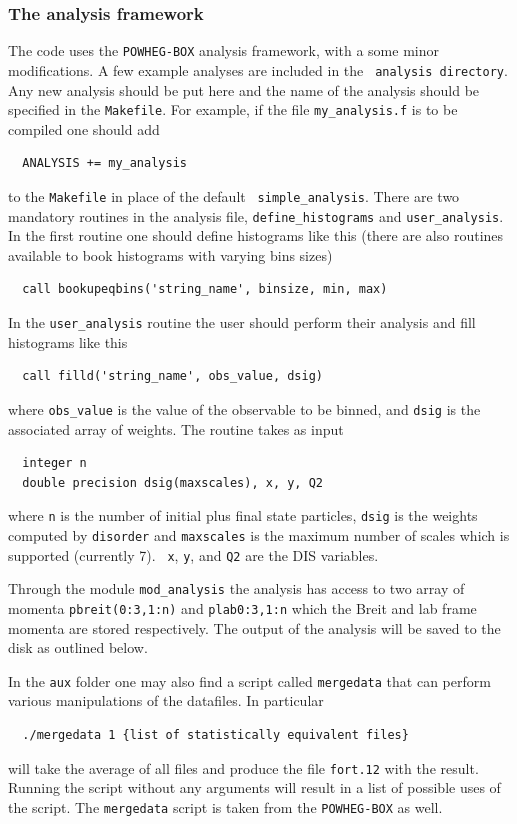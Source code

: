 \documentclass[submission, PhysCodeb]{SciPost}
\newcommand{\disorder}{{\tt disorder}}
\begin{document}
\subsubsection{The analysis framework}
The code uses the {\tt POWHEG-BOX} analysis framework, with a some
minor modifications. A few example analyses are included in the {\tt
  analysis directory}. Any new analysis should be put here and the
name of the analysis should be specified in the {\tt Makefile}. For
example, if the file {\tt my\_analysis.f} is to be compiled one should
add
\begin{lstlisting}
  ANALYSIS += my_analysis
\end{lstlisting}
to the {\tt Makefile} in place of the default {\tt
  simple\_analysis}. There are two mandatory routines in the analysis
file, {\tt define\_histograms} and {\tt user\_analysis}. In the first
routine one should define histograms like this (there are also
routines available to book histograms with varying bins sizes)
\begin{lstlisting}
  call bookupeqbins('string_name', binsize, min, max)
\end{lstlisting}
In the {\tt user\_analysis} routine the user should perform their
analysis and fill histograms like this
\begin{lstlisting}
  call filld('string_name', obs_value, dsig)
\end{lstlisting}
where {\tt obs\_value} is the value of the observable to be binned, and
{\tt dsig} is the associated array of weights. The routine takes as
input
\begin{lstlisting}
  integer n
  double precision dsig(maxscales), x, y, Q2
\end{lstlisting}
where {\tt n} is the number of initial plus final state particles,
{\tt dsig} is the weights computed by \disorder{} and {\tt maxscales}
is the maximum number of scales which is supported (currently 7). {\tt
  x}, {\tt y}, and {\tt Q2} are the DIS variables.

Through the module {\tt mod\_analysis} the analysis has access to two
array of momenta {\tt pbreit(0:3,1:n)} and {\tt plab{0:3,1:n}} which
the Breit and lab frame momenta are stored respectively. The output of
the analysis will be saved to the disk as outlined below.

In the {\tt aux} folder one may also find a
script called {\tt mergedata} that can perform various manipulations
of the datafiles. In particular
\begin{lstlisting}
  ./mergedata 1 {list of statistically equivalent files}
\end{lstlisting}
will take the average of all files and produce the file {\tt fort.12}
with the result. Running the script without any arguments will result
in a list of possible uses of the script. The {\tt mergedata} script
is taken from the {\tt POWHEG-BOX} as well.
\end{document}
